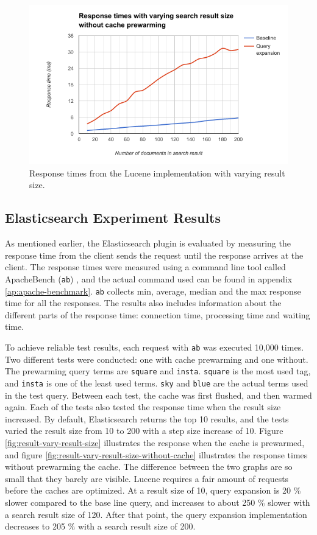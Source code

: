 \begin{figure}[h!]
  \centering \includegraphics[width=1\linewidth]{img/lucene-results.png}
  \caption{Response times from the Lucene implementation with varying result size.}
  \label{fig:lucene-results}
\end{figure}

\subsection{Elasticsearch Experiment Results}
As mentioned earlier,
the Elasticsearch plugin is evaluated by measuring the response time from the client sends the request until the response arrives at the client.
The response times were measured using a command line tool called ApacheBench (\texttt{ab}) \cite{apache-benchmark},
and the actual command used can be found in appendix \ref{ap:apache-benchmark}.
\texttt{ab} collects min, average, median and the max response time for all the responses.
The results also includes information about the different parts of the response time:
connection time, processing time and waiting time.

To achieve reliable test results,
each request with \texttt{ab} was executed 10,000 times.
Two different tests were conducted: one with cache prewarming and one without.
The prewarming query terms are \texttt{square} and \texttt{insta}.
\texttt{square} is the most used tag, and \texttt{insta} is one of the least used terms.
\texttt{sky} and \texttt{blue} are the actual terms used in the test query.
Between each test, the cache was first flushed, and then warmed again.
Each of the tests also tested the response time when the result size increased.
By default, Elasticsearch returns the top 10 results,
and the tests varied the result size from 10 to 200 with a step size increase of 10.
Figure \ref{fig:result-vary-result-size} illustrates the response when the cache is prewarmed,
and figure \ref{fig:result-vary-result-size-without-cache} illustrates the response times without prewarming the cache.
The difference between the two graphs are so small that they barely are visible.
Lucene requires a fair amount of requests before the caches are optimized.
At a result size of 10, query expansion is 20 \% slower compared to the base line query,
and increases to about 250 \% slower with a search result size of 120.
After that point, the query expansion implementation decreases to 205 \% with a search result size of 200.

